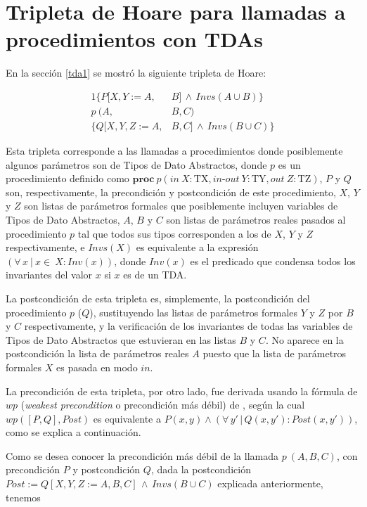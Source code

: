 \chapter{Tripleta de Hoare para llamadas a procedimientos con TDAs}
\label{derivhoare}

En la sección \ref{tda1} se mostró la siguiente tripleta de Hoare:

\begin{alignat}{1}
  \{ P[X,Y:=A,&B]\, \land \, Invs(A \cup B)\} \nonumber \\
  p\  (A,&B,C) \label{eqn:tdatriple2} \\ 
  \{ Q[X,Y,Z:=A,&B,C]\, \land \, Invs(B \cup C)\} \nonumber
\end{alignat}

Esta tripleta corresponde a las llamadas a procedimientos donde 
posiblemente algunos parámetros son de Tipos de Dato Abstractos,
donde $p$ es un procedimiento definido como
$\textbf{proc}\ p (in\ X : \textrm{TX}, in\textrm{-}out\ Y : \textrm{TY}, out\ Z : \textrm{TZ})$, $P$ y $Q$ son, respectivamente, la precondición y postcondición de este procedimiento, $X$, $Y$ y $Z$ son listas de parámetros formales que posiblemente incluyen
variables de Tipos de Dato Abstractos, $A$, $B$ y $C$ son listas de parámetros reales pasados al procedimiento $p$ tal que todos sus tipos corresponden a los de $X$, $Y$ y $Z$ respectivamente, e $Invs(X)$ es equivalente a la expresión $(\forall\, x\ |\ x \in\ X : Inv(x) )$, donde $Inv(x)$ es el predicado que condensa todos los
invariantes del valor $x$ si $x$ es de un TDA.

La postcondición de esta tripleta es, simplemente, la postcondición del procedimiento $p$ ($Q$), sustituyendo las listas de parámetros formales $Y$ y $Z$ por $B$ y $C$ respectivamente, y la verificación de los invariantes de todas las variables de Tipos de Dato Abstractos que estuvieran en las listas $B$ y $C$. No aparece en la postcondición la lista de parámetros reales $A$ puesto que la lista de parámetros formales $X$ es pasada en modo $in$.

La precondición de esta tripleta, por otro lado, fue derivada usando la fórmula de $wp$ (\textit{weakest precondition} o precondición más débil) de \cite{flaviani}, según la cual $wp([P, Q], Post)$ es equivalente a $P (x,y) \land (\forall\, y'\,|\,Q(x, y') : Post (x, y'))$, como se explica a continuación.

Como se desea conocer la precondición más débil de la llamada $p\  (A,B,C)$, con precondición $P$ y postcondición $Q$, dada la postcondición $Post := Q[X,Y,Z := A,B,C]\, \land \, Invs(B \cup C)$ explicada anteriormente, tenemos

